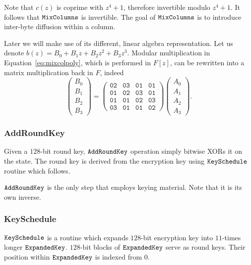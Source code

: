 	Note that $c(z)$ is coprime with $z^4+1$, therefore invertible modulo $z^4+1$. It follows that $\texttt{MixColumns}$ is invertible. The goal of $\texttt{MixColumns}$ is to introduce inter-byte diffusion within a column.
	
	Later we will make use of its different, linear algebra representation. Let us denote $b(z) = B_0 + B_1 z + B_2 z^2 + B_3 z^3$. Modular multiplication in Equation~\ref{eq:mixcolpoly}, which is performed in $F[z]$, can be rewritten into a matrix multiplication back in $F$, indeed
	\begin{equation}
	\label{eq:mixcolmatr}
		\begin{pmatrix}
			B_0 \\ B_1 \\ B_2 \\ B_3
		\end{pmatrix}
		=
		\begin{pmatrix}
			\texttt{02} & \texttt{03} & \texttt{01} & \texttt{01} \\
			\texttt{01} & \texttt{02} & \texttt{03} & \texttt{01} \\
			\texttt{01} & \texttt{01} & \texttt{02} & \texttt{03} \\
			\texttt{03} & \texttt{01} & \texttt{01} & \texttt{02}
		\end{pmatrix}
		\begin{pmatrix}
			A_0 \\ A_1 \\ A_2 \\ A_3
		\end{pmatrix}.
	\end{equation}

\subsubsection{AddRoundKey}
	
	Given a $128$-bit round key, $\texttt{AddRoundKey}$ operation simply bitwise XORs it on the state. The round key is derived from the encryption key using $\texttt{KeySchedule}$ routine which follows.
	
	$\texttt{AddRoundKey}$ is the only step that employs keying material. Note that it is its own inverse.

\subsubsection{KeySchedule}
	
	$\texttt{KeySchedule}$ is a routine which expands $128$-bit encryption key into $11$-times longer $\texttt{ExpandedKey}$. $128$-bit blocks of $\texttt{ExpandedKey}$ serve as round keys. Their position within $\texttt{ExpandedKey}$ is indexed from $0$.
	
